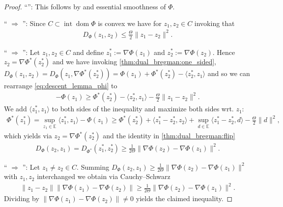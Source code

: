 \documentclass[11pt,onecolumn]{article}
\DeclareMathOperator{\dom}{dom}
\DeclareMathOperator{\intr}{int}
\theoremstyle{remark}
\begin{document}
\begin{proof}
``'': This follows by \cite[Proposition 2.10]{bauschke2000dykstras} and essential smoothness of $\Phi$.

`` $\Rightarrow$ '':
    Since $C \subset \intr \dom \Phi$ is convex we have for $z_1,z_2 \in C$ invoking \cite[Theorem 2.1.5]{nesterov2018lectures} that
    \begin{align} \label{eq:descent_lemma_phi}
        D_\Phi(z_1, z_2) \leq \tfrac{\Theta}{2}\|z_1 -z_2\|^2.
    \end{align}

`` $\Rightarrow$ '':
    Let $z_1,z_2 \in C$ and define $z_1^*:=\nabla \Phi(z_1)$ and $z_2^*:=\nabla \Phi(z_2)$. Hence $z_2=\nabla \Phi^*(z_2^*)$ and we have invoking \cref{thm:dual_bregman:one_sided}, $D_\Phi(z_1, z_2)=D_\Phi(z_1, \nabla \Phi^*(z_2^*))=\Phi(z_1) + \Phi^*(z_2^*) - \langle z_2^*, z_1\rangle$ and so we can rearrange \cref{eq:descent_lemma_phi} to
    \begin{align}
        -\Phi(z_1) \geq \Phi^*(z_2^*)-\langle z_2^*, z_1\rangle - \tfrac{\Theta}{2}\|z_1 -z_2\|^2.
    \end{align}
    We add $\langle z_1^*, z_1\rangle$ to both sides of the inequality and maximize both sides wrt. $z_1$:
    \begin{align}
        \Phi^*(z_1^*)=\sup_{z_1 \in \mathbb{E}}\langle z_1^*, z_1\rangle-\Phi(z_1) \geq \Phi^*(z_2^*) +\langle z_1^*-z_2^*,z_2 \rangle + \sup_{d \in \mathbb{E}} \langle z_1^*-z_2^*, d\rangle - \tfrac{\Theta}{2}\|d\|^2,
    \end{align}
    which yields via $z_2=\nabla \Phi^*(z_2^*)$ and the identity in \cref{thm:dual_bregman:flip}
    \begin{align}
        D_\Phi(z_2, z_1) = D_{\Phi^*}(z_1^*,z_2^*) \geq \tfrac{1}{2\Theta}\|\nabla \Phi(z_2)-\nabla \Phi(z_1)\|^2.
    \end{align}

`` $\Rightarrow$ '':
    Let $z_1 \neq z_2 \in C$. Summing $D_\Phi(z_2, z_1) \geq \tfrac{1}{2\Theta}\|\nabla \Phi(z_2)-\nabla \Phi(z_1)\|^2$ with $z_1,z_2$ interchanged we obtain via Cauchy--Schwarz
    \begin{align}
        \|z_1 -z_2\|\|\nabla\Phi(z_1)-\nabla \Phi(z_2)\| \geq \tfrac{1}{2\Theta}\|\nabla \Phi(z_2)-\nabla \Phi(z_1)\|^2.
    \end{align}
    Dividing by $\|\nabla\Phi(z_1)-\nabla \Phi(z_2)\| \neq 0$ yields the claimed inequality.
\end{proof}
\end{document}
